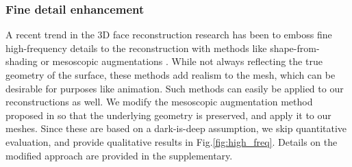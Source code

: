 \documentclass[10pt,twocolumn,letterpaper]{article}
\begin{document}


\subsubsection{Fine detail enhancement}
A recent trend in the 3D face reconstruction research has been to emboss fine high-frequency details to the reconstruction with methods like shape-from-shading \cite{or2015rgbd} or mesoscopic augmentations \cite{beeler2010high}. While not always reflecting the true geometry of the surface, these methods add realism to the mesh, which can be desirable for purposes like animation. Such methods can easily be applied to our reconstructions as well. We modify the mesoscopic augmentation method proposed in \cite{sela2017unrestricted} so that the underlying geometry is preserved, and apply it to our meshes. Since these are based on a dark-is-deep assumption, we skip quantitative evaluation, and provide qualitative results in Fig.\ref{fig:high_freq}. Details on the modified approach are provided in the supplementary.
\end{document}
